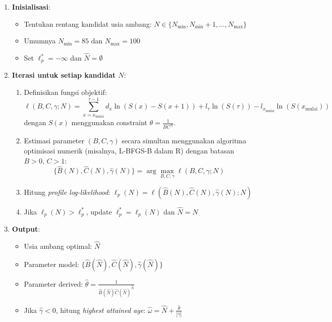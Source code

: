 \begin{enumerate}
    \item \textbf{Inisialisasi}:
    \begin{itemize}
        \item Tentukan rentang kandidat usia ambang: $N \in \{N_{\min}, N_{\min}+1, \ldots, N_{\max}\}$
        \item Umumnya $N_{\min} = 85$ dan $N_{\max} = 100$
        \item Set $\ell_p^* = -\infty$ dan $\hat{N} = \emptyset$
    \end{itemize}
    
    \item \textbf{Iterasi untuk setiap kandidat $N$}:
    \begin{enumerate}
        \item Definisikan fungsi objektif:
        \begin{equation}
        \ell(B, C, \gamma; N) = \sum_{x=x_{\text{mulai}}}^{\tau-1} d_x \ln(S(x) - S(x+1)) + l_\tau \ln(S(\tau)) - l_{x_{\text{mulai}}} \ln(S(x_{\text{mulai}}))
        \end{equation}
        dengan $S(x)$ menggunakan constraint $\theta = \frac{1}{BC^N}$.
        
        \item Estimasi parameter $(B, C, \gamma)$ secara simultan menggunakan algoritma optimisasi numerik (misalnya, L-BFGS-B dalam R) dengan batasan $B > 0$, $C > 1$:
        \begin{equation}
        \{\hat{B}(N), \hat{C}(N), \hat{\gamma}(N)\} = \arg\max_{B, C, \gamma} \ell(B, C, \gamma; N)
        \end{equation}
        
        \item Hitung \textit{profile log-likelihood}: $\ell_p(N) = \ell(\hat{B}(N), \hat{C}(N), \hat{\gamma}(N); N)$
        
        \item Jika $\ell_p(N) > \ell_p^*$, update $\ell_p^* = \ell_p(N)$ dan $\hat{N} = N$
    \end{enumerate}
    
    \item \textbf{Output}: 
    \begin{itemize}
        \item Usia ambang optimal: $\hat{N}$
        \item Parameter model: $\{\hat{B}(\hat{N}), \hat{C}(\hat{N}), \hat{\gamma}(\hat{N})\}$
        \item Parameter derived: $\hat{\theta} = \frac{1}{\hat{B}(\hat{N})\hat{C}(\hat{N})^{\hat{N}}}$
        \item Jika $\hat{\gamma} < 0$, hitung \textit{highest attained age}: $\hat{\omega} = \hat{N} + \frac{\hat{\theta}}{|\hat{\gamma}|}$
    \end{itemize}
\end{enumerate}


